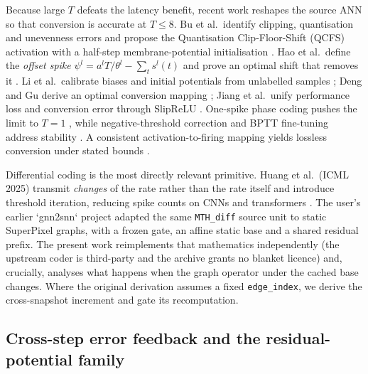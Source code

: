 \documentclass[preprint,12pt]{elsarticle}
\begin{document}
Because large $T$ defeats the latency benefit, recent work reshapes the source ANN so that conversion is accurate at $T\le 8$. Bu et al.\ identify clipping, quantisation and unevenness errors and propose the Quantisation Clip-Floor-Shift (QCFS) activation with a half-step membrane-potential initialisation \cite{bu2022qcfs}. Hao et al.\ define the \emph{offset spike} $\psi^{l}=a^{l}T/\theta^{l}-\sum_t s^{l}(t)$ and prove an optimal shift that removes it \cite{cos2023offset}. Li et al.\ calibrate biases and initial potentials from unlabelled samples \cite{li2021freelunch,li2022snncap}; Deng and Gu derive an optimal conversion mapping \cite{deng2021optimal}; Jiang et al.\ unify performance loss and conversion error through SlipReLU \cite{jiang2024universal}. One-spike phase coding pushes the limit to $T{=}1$ \cite{li2024onespike}, while negative-threshold correction and BPTT fine-tuning address stability \cite{xia2026neuro}. A consistent activation-to-firing mapping yields lossless conversion under stated bounds \cite{li2024casc}.

Differential coding is the most directly relevant primitive. Huang et al.\ (ICML 2025) transmit \emph{changes} of the rate rather than the rate itself and introduce threshold iteration, reducing spike counts on CNNs and transformers \cite{huang2025dcgs}. The user's earlier `gnn2snn` project adapted the same \texttt{MTH\_diff} source unit to static SuperPixel graphs, with a frozen gate, an affine static base and a shared residual prefix. The present work reimplements that mathematics independently (the upstream coder is third-party and the archive grants no blanket licence) and, crucially, analyses what happens when the graph operator under the cached base changes. Where the original derivation assumes a fixed \texttt{edge\_index}, we derive the cross-snapshot increment and gate its recomputation.

\subsection{Cross-step error feedback and the residual-potential family}
\end{document}
